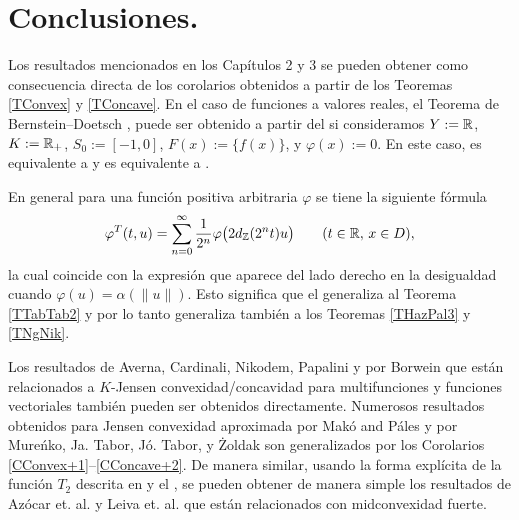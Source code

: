 \chapter*{Conclusiones.}

Los resultados mencionados en los Capítulos 2 y 3 se pueden obtener como consecuencia directa de
los corolarios obtenidos a partir de los Teoremas \ref{TConvex} y \ref{TConcave}.
En el caso de funciones a valores reales, el Teorema de Bernstein--Doetsch \cite{BerDoe15},
puede ser obtenido a partir del  si consideramos 
$Y:=\mathbb{R}$, $K:=\mathbb{R}_+$, $S_0:=[-1,0]$, $F(x):=\{f(x)\}$, y $\varphi(x):=0$. En este caso,
 es equivalente a  y  es equivalente a 
.

En general para una función positiva arbitraria $\varphi$ se tiene la siguiente
fórmula 
$$
\varphi^T(t,u)=\sum_{n=0}^{\infty}\frac{1}{2^n}\varphi\big(2d_{\mathbb{Z}}(2^nt)u\big)
\qquad(t\in\mathbb{R},\,x\in D),
$$
la cual coincide con la expresión que aparece 
del lado derecho en la desigualdad 
cuando $\varphi(u)=\alpha(\|u\|)$. Esto significa que el 
generaliza al Teorema \ref{TTabTab2} y por lo tanto generaliza
también a los Teoremas \ref{THazPal3} y \ref{TNgNik}.

Los resultados de Averna, Cardinali, Nikodem, Papalini 
\cite{AveCar90,CarNikPap93,Nik86,Nik87a,Nik87c,Nik89,Pap90} 
y por Borwein \cite{Bor77} que están relacionados a $K$-Jensen convexidad/concavidad
para multifunciones y funciones vectoriales también pueden ser obtenidos directamente. 
Numerosos resultados obtenidos para Jensen convexidad aproximada por Makó and Páles 
\cite{MakPal10b,MakPal13b} y por Mureńko, Ja. Tabor, Jó. Tabor, y Żoldak
\cite{MurTabTab12,TabTab09b,TabTab09a,TabTabZol10b,TabTabZol10a} son generalizados por los
 Corolarios \ref{CConvex+1}--\ref{CConcave+2}.
De manera similar, usando la forma explícita de la función
$T_2$ descrita en  y el , se pueden obtener 
de manera simple los resultados de Azócar et. al. \cite{AzoGimNikSan11} y Leiva et. al.
\cite{LeiMerNikSan13} que están relacionados con midconvexidad fuerte.
